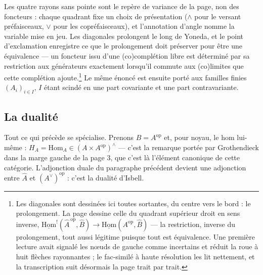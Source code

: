 \documentclass[11pt,a4paper]{article}
\begin{document}
Les quatre rayons sans pointe sont le repère de variance de la page, non
des foncteurs : chaque quadrant fixe un choix de présentation
($\wedge$ pour le versant préfaisceaux, $\vee$ pour les copréfaisceaux), et
l'annotation d'angle nomme la variable mise en jeu. Les diagonales
prolongent le long de Yoneda, et le point d'exclamation enregistre ce que le
prolongement doit préserver pour être une équivalence — un foncteur issu
d'une (co)complétion libre est déterminé par sa restriction aux générateurs
exactement lorsqu'il commute aux (co)limites que cette complétion
ajoute.\footnote{Les diagonales sont dessinées ici toutes sortantes, du
centre vers le bord : le prolongement. La page dessine celle du quadrant
supérieur droit en sens inverse,
$\underline{\mathrm{Hom}}^{!}(\widehat{A}^{\,\mathrm{op}},\widehat{B}) \to
\underline{\mathrm{Hom}}(A^{\mathrm{op}},\widehat{B})$ — la restriction,
inverse du prolongement, tout aussi légitime puisque tout est équivalence.
Une première lecture avait signalé les nœuds de gauche comme incertains et
réduit la roue à huit flèches rayonnantes ; le fac-similé à haute résolution
les lit nettement, et la transcription suit désormais la page trait par
trait.} Le même énoncé est ensuite
porté aux familles finies $(A_{i})_{i \in I}$, $I$ étant scindé en une part
covariante et une part contravariante.

\subsection*{La dualité}

Tout ce qui précède se spécialise. Prenons $B = A^{\mathrm{op}}$ et, pour
noyau, le hom lui-même : $H_{A} = \mathrm{Hom}_{A} \in (A \times
A^{\mathrm{op}})^{\wedge}$ — c'est la remarque portée par Grothendieck dans la
marge gauche de la page 3, que c'est là l'élément canonique de cette
catégorie. L'adjonction duale du paragraphe précédent devient une adjonction
entre $\widehat{A}$ et $(A^{\vee})^{\mathrm{op}}$ : c'est la dualité d'Isbell.
\end{document}
